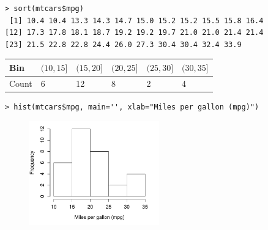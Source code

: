 \documentclass{beamer}
\begin{document}
\begin{frame}[fragile]
\small
\begin{verbatim}
> sort(mtcars$mpg)
 [1] 10.4 10.4 13.3 14.3 14.7 15.0 15.2 15.2 15.5 15.8 16.4
[12] 17.3 17.8 18.1 18.7 19.2 19.2 19.7 21.0 21.0 21.4 21.4
[23] 21.5 22.8 22.8 24.4 26.0 27.3 30.4 30.4 32.4 33.9
\end{verbatim}

\begin{tabular}{l|lllll}
Bin & $(10, 15]$ & $(15, 20]$ & $(20, 25]$ & $(25, 30]$ & $(30,35]$\\
\hline
Count & 6 & 12 & 8 & 2 & 4\\
\end{tabular}

\begin{verbatim}
> hist(mtcars$mpg, main='', xlab="Miles per gallon (mpg)")
\end{verbatim}

\begin{figure}[htbp]
\centering
\includegraphics[width=0.5\textwidth]{figure/hist_mpg1.pdf}
\end{figure}
\end{frame}
\end{document}
